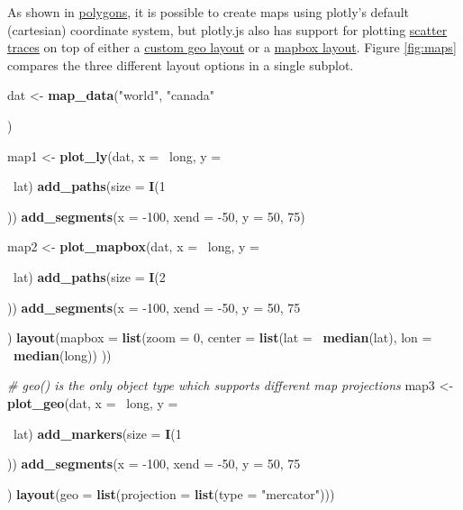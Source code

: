 \documentclass[12pt,]{isuthesis}
\newenvironment{Shaded}{\begin{snugshade}}{\end{snugshade}}
\newcommand{\KeywordTok}[1]{\textcolor[rgb]{0.13,0.29,0.53}{\textbf{{#1}}}}
\newcommand{\DataTypeTok}[1]{\textcolor[rgb]{0.13,0.29,0.53}{{#1}}}
\newcommand{\DecValTok}[1]{\textcolor[rgb]{0.00,0.00,0.81}{{#1}}}
\newcommand{\StringTok}[1]{\textcolor[rgb]{0.31,0.60,0.02}{{#1}}}
\newcommand{\CommentTok}[1]{\textcolor[rgb]{0.56,0.35,0.01}{\textit{{#1}}}}
\newcommand{\NormalTok}[1]{{#1}}
\begin{document}
As shown in \protect\hyperlink{polygons}{polygons}, it is possible to
create maps using plotly's default (cartesian) coordinate system, but
plotly.js also has support for plotting
\protect\hyperlink{scatter-traces}{scatter traces} on top of either a
\href{https://plot.ly/r/reference/\#layout-geo}{custom geo layout} or a
\href{https://plot.ly/r/reference/\#layout-mapbox}{mapbox layout}.
Figure \ref{fig:maps} compares the three different layout options in a
single subplot.

\begin{Shaded}
\begin{Highlighting}[]
\NormalTok{dat <-}\StringTok{ }\KeywordTok{map_data}\NormalTok{(}\StringTok{"world"}\NormalTok{, }\StringTok{"canada"}\NormalTok{) %

\NormalTok{map1 <-}\StringTok{ }\KeywordTok{plot_ly}\NormalTok{(dat, }\DataTypeTok{x =} \NormalTok{~long, }\DataTypeTok{y =} \NormalTok{~lat) %
\StringTok{  }\KeywordTok{add_paths}\NormalTok{(}\DataTypeTok{size =} \KeywordTok{I}\NormalTok{(}\DecValTok{1}\NormalTok{)) %
\StringTok{  }\KeywordTok{add_segments}\NormalTok{(}\DataTypeTok{x =} \NormalTok{-}\DecValTok{100}\NormalTok{, }\DataTypeTok{xend =} \NormalTok{-}\DecValTok{50}\NormalTok{, }\DataTypeTok{y =} \DecValTok{50}\NormalTok{, }\DecValTok{75}\NormalTok{)}

\NormalTok{map2 <-}\StringTok{ }\KeywordTok{plot_mapbox}\NormalTok{(dat, }\DataTypeTok{x =} \NormalTok{~long, }\DataTypeTok{y =} \NormalTok{~lat) %
\StringTok{  }\KeywordTok{add_paths}\NormalTok{(}\DataTypeTok{size =} \KeywordTok{I}\NormalTok{(}\DecValTok{2}\NormalTok{)) %
\StringTok{  }\KeywordTok{add_segments}\NormalTok{(}\DataTypeTok{x =} \NormalTok{-}\DecValTok{100}\NormalTok{, }\DataTypeTok{xend =} \NormalTok{-}\DecValTok{50}\NormalTok{, }\DataTypeTok{y =} \DecValTok{50}\NormalTok{, }\DecValTok{75}\NormalTok{) %
\StringTok{  }\KeywordTok{layout}\NormalTok{(}\DataTypeTok{mapbox =} \KeywordTok{list}\NormalTok{(}\DataTypeTok{zoom =} \DecValTok{0}\NormalTok{,}
      \DataTypeTok{center =} \KeywordTok{list}\NormalTok{(}\DataTypeTok{lat =} \NormalTok{~}\KeywordTok{median}\NormalTok{(lat), }\DataTypeTok{lon =} \NormalTok{~}\KeywordTok{median}\NormalTok{(long))}
   \NormalTok{))}

\CommentTok{# geo() is the only object type which supports different map projections}
\NormalTok{map3 <-}\StringTok{ }\KeywordTok{plot_geo}\NormalTok{(dat, }\DataTypeTok{x =} \NormalTok{~long, }\DataTypeTok{y =} \NormalTok{~lat) %
\StringTok{  }\KeywordTok{add_markers}\NormalTok{(}\DataTypeTok{size =} \KeywordTok{I}\NormalTok{(}\DecValTok{1}\NormalTok{)) %
\StringTok{  }\KeywordTok{add_segments}\NormalTok{(}\DataTypeTok{x =} \NormalTok{-}\DecValTok{100}\NormalTok{, }\DataTypeTok{xend =} \NormalTok{-}\DecValTok{50}\NormalTok{, }\DataTypeTok{y =} \DecValTok{50}\NormalTok{, }\DecValTok{75}\NormalTok{) %
\StringTok{  }\KeywordTok{layout}\NormalTok{(}\DataTypeTok{geo =} \KeywordTok{list}\NormalTok{(}\DataTypeTok{projection =} \KeywordTok{list}\NormalTok{(}\DataTypeTok{type =} \StringTok{"mercator"}\NormalTok{)))}

}}}}}}}}}
\end{Highlighting}
\end{Shaded}
\end{document}
